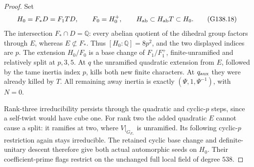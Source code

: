 \begin{proof}
Set
\[
 H_0=F_*D=F_1TD,\qquad F_0=H_0^+,\qquad
 H_{\rm ab}\subset H_{\rm ab}T\subset H_0.
 \tag{G138.18}
\]
The intersection \(F_*\cap D=\mathbb Q\): every abelian
quotient of the dihedral group factors through \(E\), whereas
\(E\not\subset F_*\).  Thus \([H_0:\mathbb Q]=8p^2\),
and the two displayed indices are \(p\).
The extension \(H_0/F_0\) is a base change of
\(F_1/F_1^+\), finite-unramified and relatively split at
\(p,3,5\).  At \(q\) the unramified quadratic extension from
\(E\), followed by the tame inertia index \(p\), kills both
new finite characters.  At \(q_{\rm aux}\) they were already
killed by \(T\).  All remaining away inertia is exactly
\((\Psi,1,\Psi^{-1})\), with \(N=0\).

Rank-three irreducibility persists through the quadratic and
cyclic-\(p\) steps, since a self-twist would have cube one.
For rank two the added quadratic \(E\) cannot cause a split:
it ramifies at two, where \(V|_{G_{F_*}}\) is unramified.
Its following cyclic-\(p\) restriction again stays irreducible.
The retained cyclic base change and definite-unitary descent
therefore give both actual automorphic seeds on \(H_0\).
Their coefficient-prime flags restrict on the unchanged full
local field of degree \(538\).


\end{proof}
